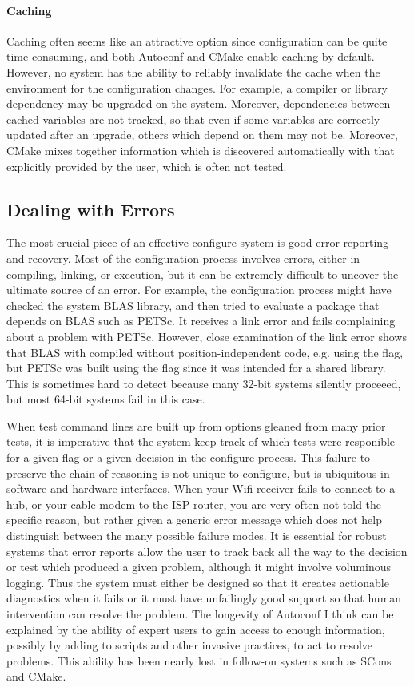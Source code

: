{{{\paragraph{Caching} Caching often seems like an attractive option since configuration can be quite
time-consuming, and both Autoconf and CMake enable caching by default. However, no system has the ability to reliably
invalidate the cache when the environment for the configuration changes. For example, a compiler or library dependency
may be upgraded on the system. Moreover, dependencies between cached variables are not tracked, so that even if some
variables are correctly updated after an upgrade, others which depend on them may not be. Moreover, CMake mixes together
information which is discovered automatically with that explicitly provided by the user, which is often not tested.

\subsection{Dealing with Errors} The most crucial piece of an effective configure system is good error reporting and
recovery. Most of the configuration process involves errors, either in compiling, linking, or execution, but it can be
extremely difficult to uncover the ultimate source of an error. For example, the configuration process might have
checked the system BLAS library, and then tried to evaluate a package that depends on BLAS such as PETSc. It receives a
link error and fails complaining about a problem with PETSc. However, close examination of the link error shows that
BLAS with compiled without position-independent code, e.g. using the  flag, but PETSc was built using
the flag since it was intended for a shared library. This is sometimes hard to detect because many 32-bit systems
silently proceeed, but most 64-bit systems fail in this case.

When test command lines are built up from options gleaned from many prior tests, it is imperative that the system keep
track of which tests were responible for a given flag or a given decision in the configure process. This failure to
preserve the chain of reasoning is not unique to configure, but is ubiquitous in software and hardware interfaces. When
your Wifi receiver fails to connect to a hub, or your cable modem to the ISP router, you are very often not told the
specific reason, but rather given a generic error message which does not help distinguish between the many possible
failure modes. It is essential for robust systems that error reports allow the user to track back all the way to the
decision or test which produced a given problem, although it might involve voluminous logging. Thus the system must
either be designed so that it creates actionable diagnostics when it fails or it must have unfailingly good support so
that human intervention can resolve the problem. The longevity of Autoconf I think can be explained by the ability of
expert users to gain access to enough information, possibly by adding  to scripts and other invasive
practices, to act to resolve problems. This ability has been nearly lost in follow-on systems such as SCons and CMake.

}}}
